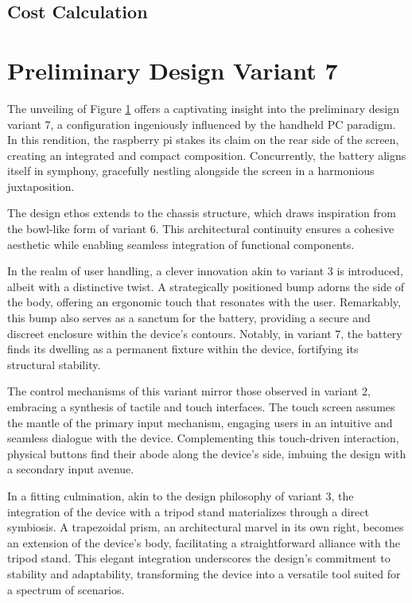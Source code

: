 \subsection{Cost Calculation}


\section{Preliminary Design Variant 7}

The unveiling of Figure \ref{} offers a captivating insight into the preliminary design variant 7, a configuration ingeniously influenced by the handheld PC paradigm. In this rendition, the raspberry pi stakes its claim on the rear side of the screen, creating an integrated and compact composition. Concurrently, the battery aligns itself in symphony, gracefully nestling alongside the screen in a harmonious juxtaposition.

The design ethos extends to the chassis structure, which draws inspiration from the bowl-like form of variant 6. This architectural continuity ensures a cohesive aesthetic while enabling seamless integration of functional components.

In the realm of user handling, a clever innovation akin to variant 3 is introduced, albeit with a distinctive twist. A strategically positioned bump adorns the side of the body, offering an ergonomic touch that resonates with the user. Remarkably, this bump also serves as a sanctum for the battery, providing a secure and discreet enclosure within the device's contours. Notably, in variant 7, the battery finds its dwelling as a permanent fixture within the device, fortifying its structural stability.

The control mechanisms of this variant mirror those observed in variant 2, embracing a synthesis of tactile and touch interfaces. The touch screen assumes the mantle of the primary input mechanism, engaging users in an intuitive and seamless dialogue with the device. Complementing this touch-driven interaction, physical buttons find their abode along the device's side, imbuing the design with a secondary input avenue.

In a fitting culmination, akin to the design philosophy of variant 3, the integration of the device with a tripod stand materializes through a direct symbiosis. A trapezoidal prism, an architectural marvel in its own right, becomes an extension of the device's body, facilitating a straightforward alliance with the tripod stand. This elegant integration underscores the design's commitment to stability and adaptability, transforming the device into a versatile tool suited for a spectrum of scenarios.


